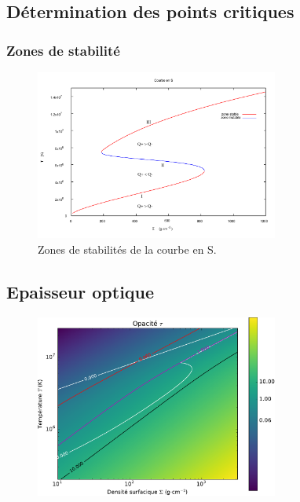 \documentclass[french]{beamer}
\begin{document}
\begin{frame}
\section{Détermination des points critiques}
\frametitle{Zones de stabilité}

   \begin{figure}[htb!]
      \includegraphics[width=8cm]{figures/stable_5.pdf}
      \caption{Zones de stabilités de la courbe en S.}
    \end{figure}
\end{frame}


\begin{frame}
\section{Epaisseur optique}

   \begin{figure}[htb!]
      \includegraphics[width=8cm]{figures/tau_map.pdf}
   \end{figure}
\end{frame}
\end{document}
